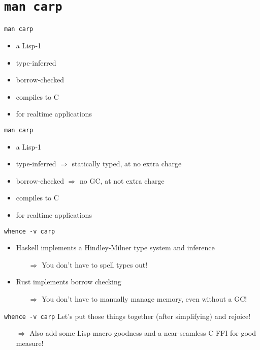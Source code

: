 \documentclass{beamer}
\begin{document}
  \section{\texttt{man carp}}
  \begin{frame}{\texttt{man carp}}
    \begin{itemize}
      \item a Lisp-1
      \item type-inferred
      \item borrow-checked
      \item compiles to C
      \item for realtime applications
    \end{itemize}
  \end{frame}
  \begin{frame}{\texttt{man carp}}
    \begin{itemize}
      \item a Lisp-1
      \item type-inferred $\Rightarrow$ statically typed, at no extra charge
      \item borrow-checked $\Rightarrow$ no GC, at not extra charge
      \item compiles to C
      \item for realtime applications
    \end{itemize}
  \end{frame}
  \begin{frame}{\texttt{whence -v carp}}
    \begin{itemize}
      \item Haskell implements a Hindley-Milner type system and inference
      \begin{itemize}
        \item[$\Rightarrow$] You don’t have to spell types out!
      \end{itemize}
      \item Rust implements borrow checking
      \begin{itemize}
        \item[$\Rightarrow$] You don’t have to manually manage memory, even without a GC!
      \end{itemize}
    \end{itemize}
  \end{frame}
  \begin{frame}{\texttt{whence -v carp}}
    Let’s put those things together (after simplifying) and rejoice!
    \begin{itemize}
      \item[$\Rightarrow$] Also add some Lisp macro goodness and a near-seamless C FFI for good measure!
    \end{itemize}
  \end{frame}
\end{document}
